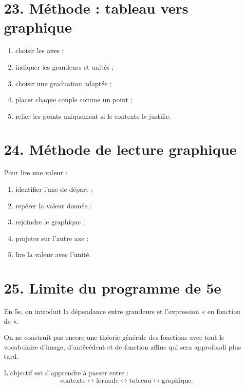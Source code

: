 \section{23. Méthode : tableau vers graphique}

\begin{methode}
\begin{enumerate}
\item choisir les axes ;
\item indiquer les grandeurs et unités ;
\item choisir une graduation adaptée ;
\item placer chaque couple comme un point ;
\item relier les points uniquement si le contexte le justifie.
\end{enumerate}
\end{methode}

\section{24. Méthode de lecture graphique}

\begin{methode}
Pour lire une valeur :
\begin{enumerate}
\item identifier l'axe de départ ;
\item repérer la valeur donnée ;
\item rejoindre le graphique ;
\item projeter sur l'autre axe ;
\item lire la valeur avec l'unité.
\end{enumerate}
\end{methode}

\section{25. Limite du programme de 5e}

\begin{attention}
En 5e, on introduit la dépendance entre grandeurs et l'expression « en fonction de ».

On ne construit pas encore une théorie générale des fonctions avec tout le vocabulaire d'image, d'antécédent et de fonction affine qui sera approfondi plus tard.
\end{attention}

L'objectif est d'apprendre à passer entre :
\[
\boxed{\text{contexte}\leftrightarrow\text{formule}\leftrightarrow\text{tableau}\leftrightarrow\text{graphique}}.
\]

